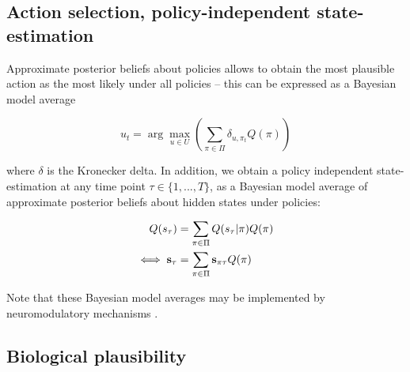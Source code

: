 \documentclass{article}
\begin{document}
\subsection{Action selection, policy-independent state-estimation}

Approximate posterior beliefs about policies allows to obtain the most plausible action as the most likely under all policies -- this can be expressed as a Bayesian model average

\begin{equation}
\label{eq: action selection}
    u_t = \arg \max_{u \in U } \left (\sum_{\pi \in \Pi} \delta_{u, \pi_t} Q(\pi)\right)
\end{equation}

where $\delta$ is the Kronecker delta. In addition, we obtain a policy independent state-estimation at any time point $\tau \in \{1,...,T\}$, as a Bayesian model average of approximate posterior beliefs about hidden states under policies:

\begin{equation}
\label{eq: policy indep}
    \begin{split}
        Q(s_\tau) &= \sum_{\pi \in \Pi} Q(s_\tau |\pi)Q(\pi)\\
        \iff \bold s_\tau &= \sum_{\pi \in \Pi} \bold s_{\pi\tau} Q(\pi)
    \end{split}
\end{equation}

Note that these Bayesian model averages may be implemented by neuromodulatory mechanisms \cite{fitzgeraldModelAveragingOptimal2014}.

\subsection{Biological plausibility}
\end{document}

